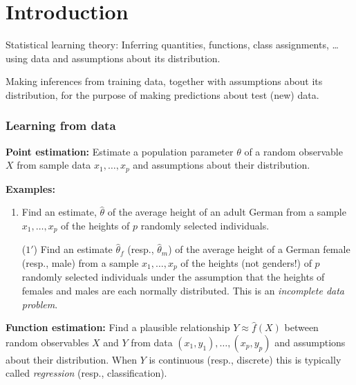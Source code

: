 \documentclass[12pt]{amsart}
\begin{document}
\part*{Introduction}

Statistical learning theory:
Inferring quantities, functions, class assignments, \ldots
using data and assumptions about its distribution.

Making inferences from training data, together with assumptions about its distribution,
for the purpose of making predictions about test (new) data.

\section{Learning from data}

\textbf{Point estimation:}
Estimate a population parameter $\theta$ of a random observable $X$ from sample data
$x_1,\ldots,x_p$ and assumptions about their distribution.

\textbf{Examples:}
\begin{enumerate}
    \setlength\itemsep{0.5em}
    \item Find an estimate, $\hat\theta$ of the average height of an adult German from a
    sample $x_1,\ldots,x_p$ of the heights of $p$ randomly selected individuals.
    \item[($1'$)] Find an estimate ${\hat\theta}_f$ (resp., ${\hat\theta}_m$) of the average height of 
    a German female (resp., male) from a sample $x_1,\ldots,x_p$ of the heights (not genders!) of $p$ randomly selected individuals
    under the assumption that the heights of females and males are each normally distributed.
    This is an \emph{incomplete data problem}.    
\end{enumerate}


\textbf{Function estimation:}
Find a plausible relationship $Y\approx \hat f(X)$ between random observables
$X$ and $Y$ from data $(x_1,y_1),\ldots,(x_p, y_p)$ and assumptions about their distribution.
When $Y$ is continuous (resp., discrete) this is typically called \emph{regression}
(resp., classification).
\end{document}
